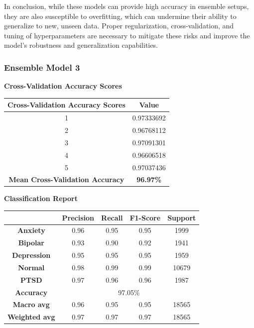 \vspace{1em}

\noindent
In conclusion, while these models can provide high accuracy in ensemble setups, they are also susceptible to overfitting, which can undermine their ability to generalize to new, unseen data. Proper regularization, cross-validation, and tuning of hyperparameters are necessary to mitigate these risks and improve the model's robustness and generalization capabilities.


\subsubsection{Ensemble Model 3}

\begin{center}
    \textbf{Cross-Validation Accuracy Scores} \\[0.5em]
    \begin{tabular}{|c|c|}
        \hline
        \textbf{Cross-Validation Accuracy Scores} & \textbf{Value} \\ \hline
        1 & 0.97333692 \\ \hline
        2 & 0.96768112 \\ \hline
        3 & 0.97091301 \\ \hline
        4 & 0.96606518 \\ \hline
        5 & 0.97037436 \\ \hline
        \textbf{Mean Cross-Validation Accuracy} & \textbf{96.97\%} \\ \hline
    \end{tabular}
\end{center}

\pagebreak

\begin{center}
    \textbf{Classification Report} \\[0.5em]
    \begin{tabular}{|c|c|c|c|c|}
        \hline
        & \textbf{Precision} & \textbf{Recall} & \textbf{F1-Score} & \textbf{Support} \\ \hline
        \textbf{Anxiety}    & 0.96 & 0.95 & 0.95 & 1999 \\ \hline
        \textbf{Bipolar}    & 0.93 & 0.90 & 0.92 & 1941 \\ \hline
        \textbf{Depression} & 0.95 & 0.95 & 0.95 & 1959 \\ \hline
        \textbf{Normal}     & 0.98 & 0.99 & 0.99 & 10679 \\ \hline
        \textbf{PTSD}       & 0.97 & 0.96 & 0.96 & 1987 \\ \hline
        \textbf{Accuracy}   & \multicolumn{4}{c|}{97.05\%} \\ \hline
        \textbf{Macro avg}  & 0.96 & 0.95 & 0.95 & 18565 \\ \hline
        \textbf{Weighted avg} & 0.97 & 0.97 & 0.97 & 18565 \\ \hline
    \end{tabular}
\end{center}

